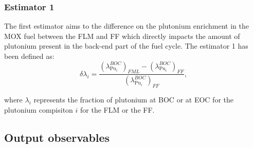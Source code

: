 \subsubsection{Estimator 1}
The first estimator aims to the difference on the plutonium enrichment in the MOX
fuel between the \gls{FLM} and \gls{FF} which directly impacts the amount of
plutonium present in the back-end part of the fuel cycle. The estimator 1 has
been defined as:
\begin{equation}
    \delta{\lambda_{i}} =
        \frac{\left(\lambda_{\mathrm{Pu}_i}^{BOC}\right)_{FML} 
              - \left(\lambda_{\mathrm{Pu}_i}^{BOC}\right)_{FF}}
             {\left(\lambda_{\mathrm{Pu}_i}^{BOC}\right)_{FF}},
\end{equation}

where $\lambda_i$ represents the fraction of plutonium at \gls{BOC} or at
\gls{EOC} for the plutonium compisiton $i$ for the \gls{FLM} or the \gls{FF}. 

\subsection{Output observables}


